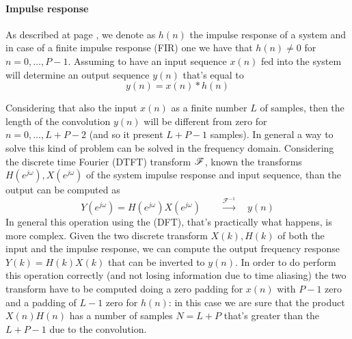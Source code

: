 	\paragraph{Impulse response} As described at page \pageref{sec:impulseresponse}, we denote as $h(n)$ the impulse response of a system and in case of a finite impulse response (FIR) one we have that $h(n) \neq 0$ for $n=0,\dots,P-1$. Assuming to have an input sequence $x(n)$ fed into the system will determine an output sequence $y(n)$ that's equal to
	\[ y(n) = x(n) * h(n) \] 
	
	Considering that also the input $x(n)$ as a finite number $L$ of samples, then the length of the convolution $y(n)$ will be different from zero for $n=0,\dots, L+P-2$ (and so it present $L+P-1$ samples). In general a way to solve this kind of problem can be solved in the frequency domain. Considering the discrete time Fourier (DTFT) transform $\mathscr F$, known the transforms $H(e^{j\omega}), X(e^{j\omega})$ of the system impulse response and input sequence, than the output can be computed as
	\[ Y(e^{j\omega}) = H(e^{j\omega}) X(e^{j\omega}) \qquad \xrightarrow{\mathscr{F}^{-1}} \quad y(n) \]
	In general this operation using the \dft (DFT), that's practically what happens, is more complex. Given the two discrete transform $X(k),H(k)$ of both the input and the impulse response, we can compute the output frequency response $Y(k) = H(k) X(k)$ that can be inverted to $y(n)$. In order to do perform this operation correctly (and not losing information due to time aliasing) the two transform have to be computed doing a zero padding for $x(n)$ with $P-1$ zero and a padding of $L-1$ zero for $h(n)$: in this case we are sure that the product $X(n)H(n)$ has a number of samples $N = L+P$ that's greater than the $L+P-1$ due to the convolution.
	
	
	
	
	
	
	
	
	
	
	
	
	
	
	
	
	
	
	
	
	
	
	
	
	
	
	
	
	
	
	
	
	
	
	
	
	
	
	
	
	
	
	
	
	
	
	
	
	
	
	
	
	